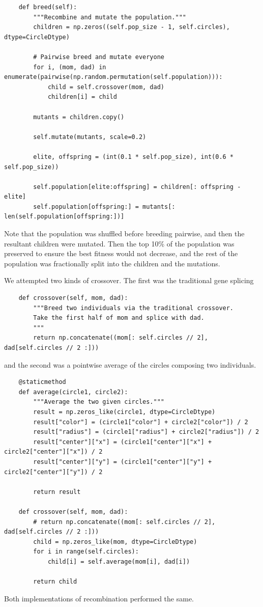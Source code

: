 \documentclass{article}
\begin{document}
\begin{verbatim}
    def breed(self):
        """Recombine and mutate the population."""
        children = np.zeros((self.pop_size - 1, self.circles), dtype=CircleDtype)
    
        # Pairwise breed and mutate everyone
        for i, (mom, dad) in enumerate(pairwise(np.random.permutation(self.population))):
            child = self.crossover(mom, dad)
            children[i] = child
    
        mutants = children.copy()
    
        self.mutate(mutants, scale=0.2)
    
        elite, offspring = (int(0.1 * self.pop_size), int(0.6 * self.pop_size))
    
        self.population[elite:offspring] = children[: offspring - elite]
        self.population[offspring:] = mutants[: len(self.population[offspring:])]
\end{verbatim}

Note that the population was shuffled before breeding pairwise, and then the resultant children were mutated. Then the top 10\% of the population was preserved to ensure the best fitness would not decrease, and the rest of the population was fractionally split into the children and the mutations.

We attempted two kinds of crossover. The first was the traditional gene splicing

\begin{verbatim}
    def crossover(self, mom, dad):
        """Breed two individuals via the traditional crossover.
        Take the first half of mom and splice with dad.
        """
        return np.concatenate((mom[: self.circles // 2], dad[self.circles // 2 :]))
\end{verbatim}

and the second was a pointwise average of the circles composing two individuals.
\begin{verbatim}
    @staticmethod
    def average(circle1, circle2):
        """Average the two given circles."""
        result = np.zeros_like(circle1, dtype=CircleDtype)
        result["color"] = (circle1["color"] + circle2["color"]) / 2
        result["radius"] = (circle1["radius"] + circle2["radius"]) / 2
        result["center"]["x"] = (circle1["center"]["x"] + circle2["center"]["x"]) / 2
        result["center"]["y"] = (circle1["center"]["y"] + circle2["center"]["y"]) / 2

        return result
    
    def crossover(self, mom, dad):
        # return np.concatenate((mom[: self.circles // 2], dad[self.circles // 2 :]))
        child = np.zeros_like(mom, dtype=CircleDtype)
        for i in range(self.circles):
            child[i] = self.average(mom[i], dad[i])
    
        return child
\end{verbatim}
Both implementations of recombination performed the same.
\end{document}
